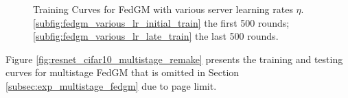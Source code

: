 \begin{figure}[h]
\vspace*{-6pt}
\centering
{}
\vspace*{-6pt}
\caption{Training Curves for FedGM with various server learning rates $\eta$. \ref{subfig:fedgm_various_lr_initial_train} the first 500 rounds; \ref{subfig:fedgm_various_lr_late_train} the last 500 rounds.}
\label{fig:fedgm_various_lr_early_late_result}
\end{figure}

\iffalse

Figure \ref{fig:resnet_cifar10_multistage_remake} presents the training and testing curves for multistage FedGM that is omitted in Section \ref{subsec:exp_multistage_fedgm} due to page limit.

